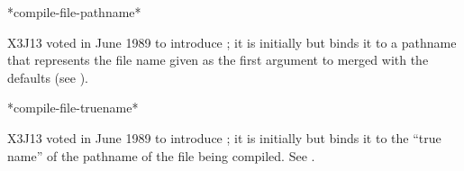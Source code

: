 \begin{newer}
\begin{defun}[Variable]
*compile-file-pathname*

X3J13 voted in June 1989  to introduce ;
it is initially  but  binds it to a pathname that
represents the file name given as the first argument to  merged
with the defaults (see ).
\end{defun}

\begin{defun}[Variable]
*compile-file-truename*

X3J13 voted in June 1989  to introduce ;
it is initially  but  binds it to the ``true name'' of
the pathname of the file being compiled.  See .
\end{defun}
\end{newer}

